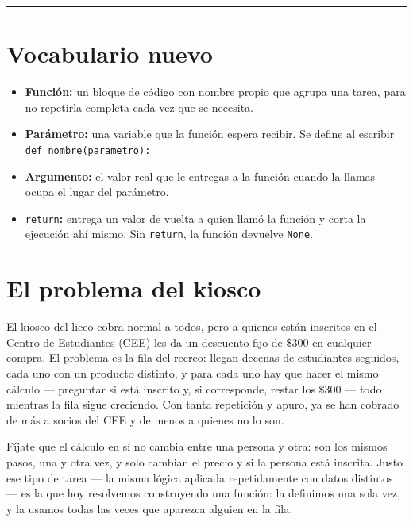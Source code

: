 \documentclass[11pt]{article}
\begin{document}
\vfill
\begin{center}
    \rule{\textwidth}{0.4pt}
\end{center}

\newpage

\section*{Vocabulario nuevo}

\begin{formulabox}
\begin{itemize}
  \item \textbf{Función:} un bloque de código con nombre propio que agrupa una tarea, para no repetirla completa cada vez que se necesita.
  \item \textbf{Parámetro:} una variable que la función espera recibir. Se define al escribir \texttt{def nombre(parametro):}
  \item \textbf{Argumento:} el valor real que le entregas a la función cuando la llamas --- ocupa el lugar del parámetro.
  \item \texttt{return}\textbf{:} entrega un valor de vuelta a quien llamó la función y corta la ejecución ahí mismo. Sin \texttt{return}, la función devuelve \texttt{None}.
\end{itemize}
\end{formulabox}

\section*{El problema del kiosco}

El kiosco del liceo cobra normal a todos, pero a quienes están inscritos en el Centro de Estudiantes (CEE) les da un descuento fijo de \$300 en cualquier compra. El problema es la fila del recreo: llegan decenas de estudiantes seguidos, cada uno con un producto distinto, y para cada uno hay que hacer el mismo cálculo --- preguntar si está inscrito y, si corresponde, restar los \$300 --- todo mientras la fila sigue creciendo. Con tanta repetición y apuro, ya se han cobrado de más a socios del CEE y de menos a quienes no lo son.

Fíjate que el cálculo en sí no cambia entre una persona y otra: son los mismos pasos, una y otra vez, y solo cambian el precio y si la persona está inscrita. Justo ese tipo de tarea --- la misma lógica aplicada repetidamente con datos distintos --- es la que hoy resolvemos construyendo una función: la definimos una sola vez, y la usamos todas las veces que aparezca alguien en la fila.
\end{document}
